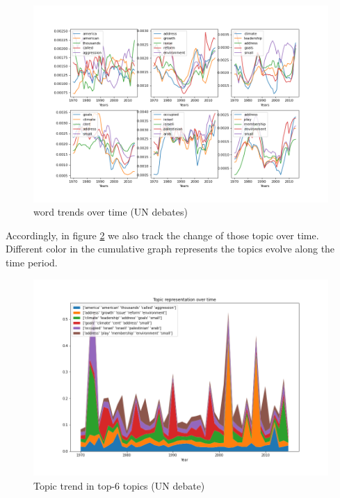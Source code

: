 \begin{figure}[h]
\centering
\includegraphics[width=0.9\linewidth]{figures/1220/scatter}
\caption{word trends over time (UN debates)}
\label{fig:scatter}
\end{figure}
Accordingly, in figure \ref{fig:stack} we also track the change of those topic over time. Different color in the cumulative graph represents the topics evolve along the time period. \\
\begin{figure}[h]
\centering
\includegraphics[width=0.9\linewidth]{figures/1220/stack}
\caption{Topic trend in top-6 topics (UN debate)}
\label{fig:stack}
\end{figure}
